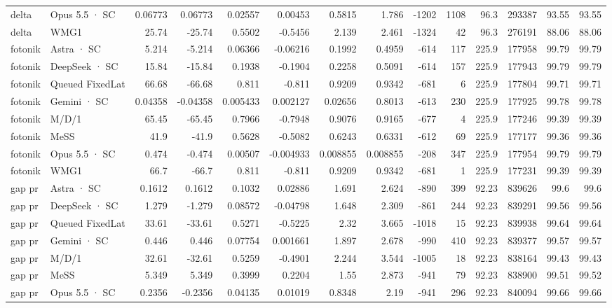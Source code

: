 \begin{tabular}{llrrrrrrrrrrrr}
delta & Opus 5.5 · SC & 0.06773 & 0.06773 & 0.02557 & 0.00453 & 0.5815 & 1.786 & -1202 & 1108 & 96.3 & 293387 & 93.55 & 93.55 \\
delta & WMG1 & 25.74 & -25.74 & 0.5502 & -0.5456 & 2.139 & 2.461 & -1324 & 42 & 96.3 & 276191 & 88.06 & 88.06 \\
fotonik & Astra · SC & 5.214 & -5.214 & 0.06366 & -0.06216 & 0.1992 & 0.4959 & -614 & 117 & 225.9 & 177958 & 99.79 & 99.79 \\
fotonik & DeepSeek · SC & 15.84 & -15.84 & 0.1938 & -0.1904 & 0.2258 & 0.5091 & -614 & 157 & 225.9 & 177943 & 99.79 & 99.79 \\
fotonik & Queued FixedLat & 66.68 & -66.68 & 0.811 & -0.811 & 0.9209 & 0.9342 & -681 & 6 & 225.9 & 177804 & 99.71 & 99.71 \\
fotonik & Gemini · SC & 0.04358 & -0.04358 & 0.005433 & 0.002127 & 0.02656 & 0.8013 & -613 & 230 & 225.9 & 177925 & 99.78 & 99.78 \\
fotonik & M/D/1 & 65.45 & -65.45 & 0.7966 & -0.7948 & 0.9076 & 0.9165 & -677 & 4 & 225.9 & 177246 & 99.39 & 99.39 \\
fotonik & MeSS & 41.9 & -41.9 & 0.5628 & -0.5082 & 0.6243 & 0.6331 & -612 & 69 & 225.9 & 177177 & 99.36 & 99.36 \\
fotonik & Opus 5.5 · SC & 0.474 & -0.474 & 0.00507 & -0.004933 & 0.008855 & 0.008855 & -208 & 347 & 225.9 & 177954 & 99.79 & 99.79 \\
fotonik & WMG1 & 66.7 & -66.7 & 0.811 & -0.811 & 0.9209 & 0.9342 & -681 & 1 & 225.9 & 177231 & 99.39 & 99.39 \\
gap pr & Astra · SC & 0.1612 & 0.1612 & 0.1032 & 0.02886 & 1.691 & 2.624 & -890 & 399 & 92.23 & 839626 & 99.6 & 99.6 \\
gap pr & DeepSeek · SC & 1.279 & -1.279 & 0.08572 & -0.04798 & 1.648 & 2.309 & -861 & 244 & 92.23 & 839291 & 99.56 & 99.56 \\
gap pr & Queued FixedLat & 33.61 & -33.61 & 0.5271 & -0.5225 & 2.32 & 3.665 & -1018 & 15 & 92.23 & 839938 & 99.64 & 99.64 \\
gap pr & Gemini · SC & 0.446 & 0.446 & 0.07754 & 0.001661 & 1.897 & 2.678 & -990 & 410 & 92.23 & 839377 & 99.57 & 99.57 \\
gap pr & M/D/1 & 32.61 & -32.61 & 0.5259 & -0.4901 & 2.244 & 3.544 & -1005 & 18 & 92.23 & 838164 & 99.43 & 99.43 \\
gap pr & MeSS & 5.349 & 5.349 & 0.3999 & 0.2204 & 1.55 & 2.873 & -941 & 79 & 92.23 & 838900 & 99.51 & 99.52 \\
gap pr & Opus 5.5 · SC & 0.2356 & -0.2356 & 0.04135 & 0.01019 & 0.8348 & 2.19 & -941 & 296 & 92.23 & 840094 & 99.66 & 99.66 \\

\end{tabular}
